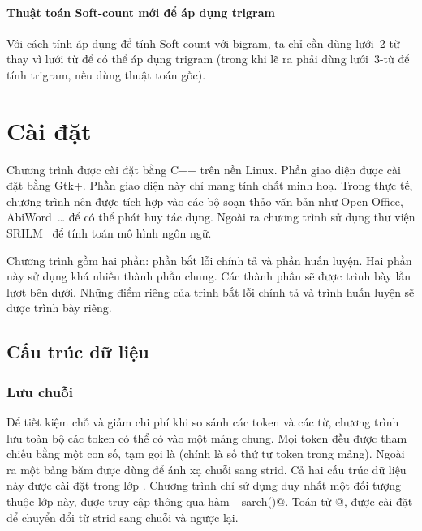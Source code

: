 \documentclass[a4paper,oneside,14pt]{extbook} %
\newcommand{\note}[1]{\underline{#1}}
\begin{document}
\subsubsection{Thuật toán Soft-count mới để áp dụng trigram}

Với cách tính áp dụng để tính Soft-count với bigram, ta chỉ cần dùng
lưới~2-từ thay vì lưới từ để có thể áp dụng trigram (trong khi lẽ ra
phải dùng lưới~3-từ để tính trigram, nếu dùng thuật toán gốc).








\chapter{Cài đặt}
\label{cha:implementation}
\minitoc
{}

Chương trình được cài đặt bằng C++ trên nền Linux. Phần giao diện được
cài đặt bằng Gtk+. Phần giao diện này chỉ mang tính chất minh
hoạ. Trong thực tế, chương trình nên được tích hợp vào các bộ soạn
thảo văn bản như Open Office, AbiWord~\ldots{} để có thể phát huy tác
dụng. Ngoài ra chương trình sử dụng thư viện SRILM~\cite{XXX} để tính toán mô
hình ngôn ngữ.

Chương trình gồm hai phần: phần bắt lỗi chính tả và phần huấn
luyện. Hai phần này sử dụng khá nhiều thành phần chung. Các
thành phần sẽ được trình bày lần lượt bên dưới. Những điểm riêng của
trình bắt lỗi chính tả và trình huấn luyện sẽ được trình bày riêng.


\section{Cấu trúc dữ liệu}
\label{sec:data-structure}

\subsection{Lưu chuỗi}
Để tiết kiệm chỗ và giảm chi phí khi so sánh các token và các từ, chương trình
lưu toàn bộ các token có thể có vào một mảng chung. Mọi token đều được
tham chiếu bằng một con số, tạm gọi là \verb@strid@ (chính là số thứ tự
token trong mảng). Ngoài ra một bảng băm được dùng để ánh xạ chuỗi
sang strid. Cả hai cấu trúc dữ liệu này được cài đặt trong lớp
\verb@StringArchive@. Chương trình chỉ sử dụng duy nhất một đối tượng 
thuộc lớp này, được truy cập thông qua hàm \verb@get_sarch()@. Toán tử
\verb@[]@, được cài đặt để chuyển đổi từ strid sang chuỗi và ngược lại.
\end{document}
